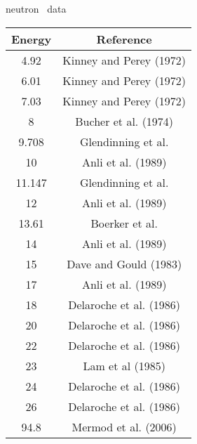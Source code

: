 \caption{\oSix neutron \el\ data}\begin{tabular}{|c||c|} 
    \hline 
    \bf{Energy} & \bf{Reference} \\
    \hline
    \hline 
    4.92 & Kinney and Perey (1972) \cite{Kinney1972}\\
    6.01 & Kinney and Perey (1972) \cite{Kinney1972}\\
    7.03 & Kinney and Perey (1972) \cite{Kinney1972}\\
    8 & Bucher et al. (1974) \cite{Bucher1974}\\
    9.708 & Glendinning et al. \cite{Glendinning1982}\\
    10 & Anli et al. (1989) \cite{Anli1989}\\
    11.147 & Glendinning et al. \cite{Glendinning1982}\\
    12 & Anli et al. (1989) \cite{Anli1989}\\
    13.61 & Boerker et al. \cite{Boerker1988}\\
    14 & Anli et al. (1989) \cite{Anli1989}\\
    15 & Dave and Gould (1983) \cite{Dave1983}\\
    17 & Anli et al. (1989) \cite{Anli1989}\\
    18 & Delaroche et al. (1986) \cite{Delaroch1986}\\
    20 & Delaroche et al. (1986) \cite{Delaroch1986}\\
    22 & Delaroche et al. (1986) \cite{Delaroch1986}\\
    23 & Lam et al (1985) \cite{Lam1985}\\
    24 & Delaroche et al. (1986) \cite{Delaroch1986}\\
    26 & Delaroche et al. (1986) \cite{Delaroch1986}\\
    94.8 & Mermod et al. (2006) \cite{Mermod2006}\\
    \hline
\end{tabular}
